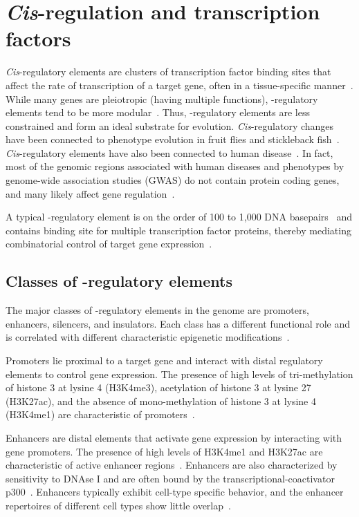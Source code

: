 \chapter{\textit{Cis}-regulation and transcription factors}
\label{chap:cisreg}
%

\textit{Cis}-regulatory elements are clusters of transcription factor binding sites that affect
the rate of transcription of a target gene, often in a tissue-specific manner~\citep{Blanchette2006,Davidson2006,Jeziorska2009}.
While many genes are pleiotropic (having multiple functions), \cis-regulatory elements tend to be more modular~\citep{Carroll2008}.
Thus, \cis-regulatory elements are less constrained and form an ideal substrate for evolution. \textit{Cis}-regulatory
changes have been connected to phenotype evolution in fruit flies and stickleback fish~\citep{Carroll2008, Chan2010}.
\textit{Cis}-regulatory elements have also been connected to human disease~\citep{Gaulton2010, Lettice2003}.  In fact, most of the
genomic regions associated with human diseases and phenotypes by genome-wide association studies (GWAS) do not contain
protein coding genes, and many likely affect gene regulation~\citep{Hindorff2009}.

A typical \cis-regulatory element is on the order of 100 to 1,000 DNA basepairs~\citep{Jeziorska2009}
and contains binding site for multiple transcription factor proteins, thereby mediating combinatorial
control of target gene expression~\citep{Remenyi2004}.
%

\section{Classes of \cis-regulatory elements}
The major classes of \cis-regulatory elements in the genome are promoters, enhancers, silencers, and insulators.
Each class has a different functional role and is correlated with different characteristic epigenetic
modifications~\citep{Maston2006}.
%

Promoters lie proximal to a target gene and interact with distal regulatory elements to control gene expression.
The presence of high levels of tri-methylation of histone 3 at lysine 4 (H3K4me3), acetylation of histone 3
at lysine 27 (H3K27ac), and the absence of mono-methylation of histone 3 at lysine 4 (H3K4me1) are characteristic
of promoters~\citep{Ernst2011}.
%

Enhancers are distal elements that activate gene expression by interacting with gene promoters.  The presence of
high levels of H3K4me1 and H3K27ac are characteristic of active enhancer regions~\citep{Ernst2011}.  Enhancers
are also characterized by sensitivity to DNAse I and are often bound by the transcriptional-coactivator p300~\citep{Kolovos2012}.
Enhancers typically exhibit cell-type specific behavior, and the enhancer repertoires of different cell types show
little overlap~\citep{Ernst2011}.
%

